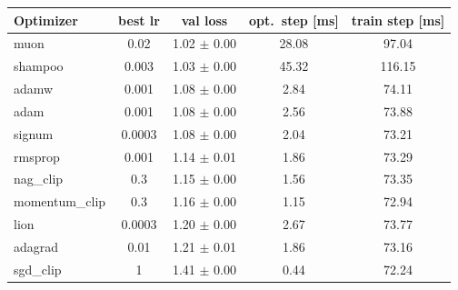 \begin{tabular}{lcccc}
\toprule
Optimizer & best lr & val loss & opt.\ step [ms] & train step [ms] \\
\midrule
muon & 0.02 & 1.02 $\pm$ 0.00 & 28.08 & 97.04 \\
shampoo & 0.003 & 1.03 $\pm$ 0.00 & 45.32 & 116.15 \\
adamw & 0.001 & 1.08 $\pm$ 0.00 & 2.84 & 74.11 \\
adam & 0.001 & 1.08 $\pm$ 0.00 & 2.56 & 73.88 \\
signum & 0.0003 & 1.08 $\pm$ 0.00 & 2.04 & 73.21 \\
rmsprop & 0.001 & 1.14 $\pm$ 0.01 & 1.86 & 73.29 \\
nag_clip & 0.3 & 1.15 $\pm$ 0.00 & 1.56 & 73.35 \\
momentum_clip & 0.3 & 1.16 $\pm$ 0.00 & 1.15 & 72.94 \\
lion & 0.0003 & 1.20 $\pm$ 0.00 & 2.67 & 73.77 \\
adagrad & 0.01 & 1.21 $\pm$ 0.01 & 1.86 & 73.16 \\
sgd_clip & 1 & 1.41 $\pm$ 0.00 & 0.44 & 72.24 \\
\bottomrule
\end{tabular}
